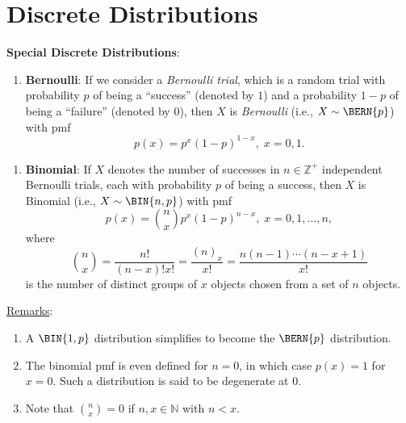 \section*{Discrete Distributions}
\textbf{Special Discrete Distributions}:
\begin{Regular}
    \begin{enumerate}[1.]
        \item \textbf{Bernoulli}: If we consider a \emph{Bernoulli trial}, which is a random trial with probability $ p $ of
              being a ``success'' (denoted by $ 1 $) and a probability $ 1-p $ of being a ``failure'' (denoted by $ 0 $), then $ X $
              is \emph{Bernoulli} (i.e., $ X \sim \BERN{p} $) with pmf
              \[ p(x)=p^x(1-p)^{1-x},\; x=0,1. \]
    \end{enumerate}
\end{Regular}
\begin{Regular}
    \begin{enumerate}[2.]
        \item \textbf{Binomial}:  If $ X $ denotes the number of successes in $ n\in\mathbb{Z}^+ $ independent Bernoulli trials,
              each with probability $ p $ of being a success, then $ X $ is Binomial (i.e., $ X \sim \BIN{n,p} $)
              with pmf
              \[ p(x)=\binom{n}{x}p^x(1-p)^{n-x},\; x=0,1,\ldots,n, \]
              where
              \[ \binom{n}{x}=\frac{n!}{(n-x)!x!}=\frac{(n)_x}{x!}=\frac{n(n-1)\cdots(n-x+1)}{x!}   \]
              is the number of distinct groups of $ x $ objects chosen from a set of $ n $ objects.
    \end{enumerate}
    \tcblower{}
    \underline{Remarks}:
    \begin{enumerate}[(1)]
        \item A $ \BIN{1,p} $ distribution simplifies to become the $ \BERN{p} $ distribution.
        \item The binomial pmf is even defined for $ n=0 $, in which case $ p(x)=1 $ for $ x=0 $. Such a
              distribution is said to be degenerate at $ 0 $.
        \item Note that $ \binom{n}{x}=0 $ if $ n,x\in\mathbb{N} $ with $ n<x $.
    \end{enumerate}
\end{Regular}
